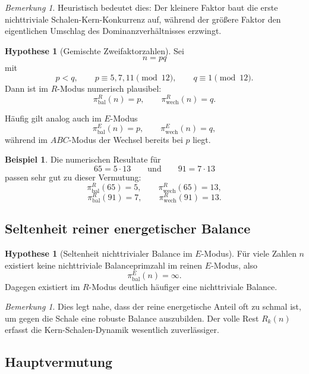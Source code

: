 \documentclass[11pt,a4paper]{article}
\theoremstyle{definition}
\newtheorem{hypothese}[satz]{Hypothese}
\newtheorem{beispiel}[satz]{Beispiel}
\theoremstyle{remark}
\newtheorem{bemerkung}[satz]{Bemerkung}
\begin{document}
	\begin{bemerkung}
		Heuristisch bedeutet dies: Der kleinere Faktor baut die erste nichttriviale
		Schalen-Kern-Konkurrenz auf, während der größere Faktor den eigentlichen Umschlag
		des Dominanzverhältnisses erzwingt.
	\end{bemerkung}
	
	\begin{hypothese}[Gemischte Zweifaktorzahlen]
		Sei
		\[
		n=pq
		\]
		mit
		\[
		p<q,\qquad
		p\equiv 5,7,11\pmod{12},\qquad
		q\equiv 1\pmod{12}.
		\]
		Dann ist im \(R\)-Modus numerisch plausibel:
		\[
		\pi_{\mathrm{bal}}^{R}(n)=p,
		\qquad
		\pi_{\mathrm{wech}}^{R}(n)=q.
		\]
		
		Häufig gilt analog auch im \(E\)-Modus
		\[
		\pi_{\mathrm{bal}}^{E}(n)=p,
		\qquad
		\pi_{\mathrm{wech}}^{E}(n)=q,
		\]
		während im \(ABC\)-Modus der Wechsel bereits bei \(p\) liegt.
	\end{hypothese}
	
	\begin{beispiel}
		Die numerischen Resultate für
		\[
		65=5\cdot 13
		\qquad\text{und}\qquad
		91=7\cdot 13
		\]
		passen sehr gut zu dieser Vermutung:
		\[
		\pi_{\mathrm{bal}}^{R}(65)=5,\qquad \pi_{\mathrm{wech}}^{R}(65)=13,
		\]
		\[
		\pi_{\mathrm{bal}}^{R}(91)=7,\qquad \pi_{\mathrm{wech}}^{R}(91)=13.
		\]
	\end{beispiel}
	
	\subsection{Seltenheit reiner energetischer Balance}
	
	\begin{hypothese}[Seltenheit nichttrivialer Balance im \(E\)-Modus]
		Für viele Zahlen \(n\) existiert keine nichttriviale Balanceprimzahl im reinen
		\(E\)-Modus, also
		\[
		\pi_{\mathrm{bal}}^{E}(n)=\infty.
		\]
		Dagegen existiert im \(R\)-Modus deutlich häufiger eine nichttriviale Balance.
	\end{hypothese}
	
	\begin{bemerkung}
		Dies legt nahe, dass der reine energetische Anteil oft zu schmal ist, um gegen die
		Schale eine robuste Balance auszubilden. Der volle Rest \(R_k(n)\) erfasst die
		Kern-Schalen-Dynamik wesentlich zuverlässiger.
	\end{bemerkung}
	
	\subsection{Hauptvermutung}
	
\end{document}
